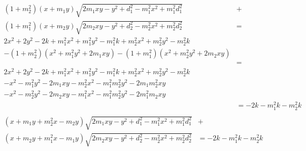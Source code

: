 \documentclass{article}
\begin{document}
\begin{align*}
  (1 + m_2^2)(x + m_1 y)\sqrt{2 m_1 x y - y^2 + d_1^2 - m_1^2 x^2 + m_1^2 d_1^2} &+ \\
  (1 + m_1^2)(x + m_2 y)\sqrt{2 m_2 x y - y^2 + d_2^2 - m_2^2 x^2 + m_2^2 d_2^2} &= \\
  2 x^2 + 2 y^2 - 2 k + m_1^2 x^2 + m_1^2 y^2 - m_1^2 k + m_2^2 x^2 + m_2^2 y^2 - m_2^2 k\\
  - (1 + m_2^2)(x^2 + m_1^2 y^2 + 2 m_1 x y) - (1 + m_1^2)(x^2 + m_2^2 y^2 + 2 m_2 x y)\\
  &= \\
  2 x^2 + 2 y^2 - 2 k + m_1^2 x^2 + m_1^2 y^2 - m_1^2 k + m_2^2 x^2 + m_2^2 y^2 - m_2^2 k\\
  - x^2 - m_1^2 y^2 - 2 m_1 x y - m_2^2 x^2 - m_1^2 m_2^2 y^2 - 2 m_1 m_2^2 x y\\
  - x^2 - m_2^2 y^2 - 2 m_2 x y - m_1^2 x^2 - m_1^2 m_2^2 y^2 - 2 m_1^2 m_2 x y\\
  &= - 2 k - m_1^2 k - m_2^2 k\\
\end{align*}
\begin{align*}
  (x + m_1 y + m_2^2 x - m_2 y) \sqrt{2 m_1 x y - y^2 + d_1^2 - m_1^2 x^2 + m_1^2 d_1^2} &+ \\
  (x + m_2 y + m_1^2 x - m_1 y) \sqrt{2 m_2 x y - y^2 + d_2^2 - m_2^2 x^2 + m_2^2 d_2^2} &= - 2 k - m_1^2 k - m_2^2 k\\
\end{align*}
\end{document}
